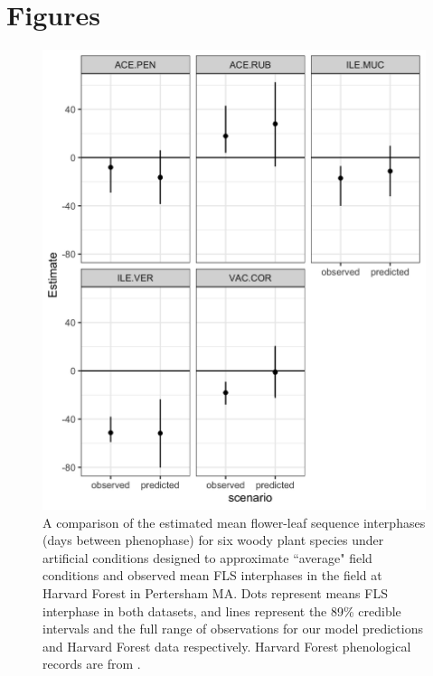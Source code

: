 \documentclass{article}\usepackage[]{graphicx}\usepackage[]{color}
\begin{document}
\pagebreak[4]

\section*{Figures}

 \begin{figure}[!ht]
    \centering
 \includegraphics[width=\textwidth]{..//Plots/fieldmodcomparisions.jpeg}
    \caption{A comparison of the estimated mean flower-leaf sequence interphases (days between phenophase) for six woody plant species under artificial conditions designed to approximate ``average" field conditions and observed mean FLS interphases in the field at Harvard Forest in Pertersham MA. Dots represent means FLS interphase in both datasets, and lines represent the 89\% credible intervals and the full range of observations for our model predictions and Harvard Forest data respectively.  Harvard Forest phenological records are from \citet{Okeefe2015}.}
    \label{fig:validate}
\end{figure}
\end{document}
